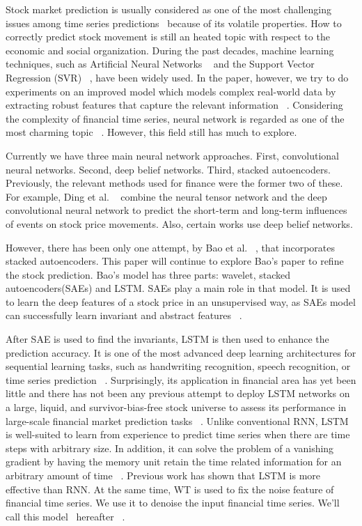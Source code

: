 Stock market prediction is usually considered as one of the most challenging issues among
time series predictions~\cite{wang2012novel} because of its volatile properties. How to correctly predict stock movement is still an heated topic with respect to the economic and social organization. During the past decades, machine learning techniques, such as Artificial Neural Networks ~\cite{chen2014deep} and the Support Vector Regression (SVR) ~\cite{guo2014feature}, have been widely used. In the paper, however, we try to do experiments on an improved model which models complex real-world
data by extracting robust features that capture the relevant information ~\cite{bao2017deep}. Considering the complexity of financial time series, neural network is regarded as one of the most charming topic ~\cite{bao2017deep}. However, this field still has much to explore.  

Currently we have three main neural network approaches. First, convolutional neural networks. Second,  deep belief networks. Third, stacked autoencoders. Previously, the relevant methods used for finance were the former two of these. For example, Ding et al. ~\cite{ding2015deep} combine the neural tensor network
and the deep convolutional neural network to predict the short-term and long-term influences
of events on stock price movements. Also, certain works use deep belief networks. 

However, there has been only one attempt, by Bao et al. ~\cite{bao2017deep}, that incorporates stacked autoencoders. This paper will continue to explore Bao's paper to refine the stock prediction. Bao's model has three parts: wavelet, stacked autoencoders(SAEs) and LSTM. SAEs play a main role in that model. It is used to learn the deep features of a stock price in an unsupervised way, as SAEs model can successfully learn invariant and abstract features ~\cite{chen2014deep}.

After SAE is used to find the invariants, LSTM is then used to enhance the prediction accuracy. It is one of the most advanced deep learning architectures for sequential learning tasks, such as handwriting recognition, speech recognition, or time series prediction ~\cite{fischer2018deep}. Surprisingly, its application in financial area has yet been little and there has not been any previous attempt to deploy LSTM networks on a large, liquid, and survivor-bias-free stock universe to assess its performance in large-scale financial market prediction tasks ~\cite{fischer2018deep}. Unlike conventional RNN, LSTM is well-suited to learn from experience to predict time series when there are time steps with arbitrary size. In addition, it can solve the problem of a vanishing gradient by having the memory unit retain the time related information for an arbitrary amount of time ~\cite{how2016behavior}. Previous work has shown that LSTM is more effective than RNN. At the same time, WT is used to fix the noise feature of financial time series. We use it to denoise the input financial time series. We'll call this model \scheme\ hereafter ~\cite{bao2017deep}.

